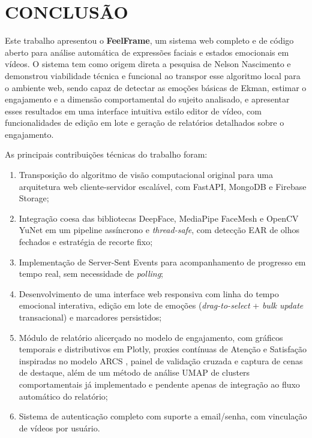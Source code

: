 \documentclass[
	12pt,
	openright,
	oneside,
	a4paper,
	english,
	brazil
	]{abntex2}
\begin{document}
\chapter{CONCLUSÃO}
\label{cap:conclusao}

Este trabalho apresentou o \textbf{FeelFrame}, um sistema web completo e de código aberto para análise automática de expressões faciais e estados emocionais em vídeos. O sistema tem como origem direta a pesquisa de Nelson Nascimento \cite{nascimento2024nelson} e demonstrou viabilidade técnica e funcional ao transpor esse algoritmo local para o ambiente web, sendo capaz de detectar as emoções básicas de Ekman, estimar o engajamento e a dimensão comportamental do sujeito analisado, e apresentar esses resultados em uma interface intuitiva estilo editor de vídeo, com funcionalidades de edição em lote e geração de relatórios detalhados sobre o engajamento.

As principais contribuições técnicas do trabalho foram:
\begin{enumerate}
    \item Transposição do algoritmo de visão computacional original \cite{nascimento2024nelson} para uma arquitetura web cliente-servidor escalável, com FastAPI, MongoDB e Firebase Storage;
    \item Integração coesa das bibliotecas DeepFace, MediaPipe FaceMesh e OpenCV YuNet em um pipeline assíncrono e \textit{thread-safe}, com detecção EAR de olhos fechados e estratégia de recorte fixo;
    \item Implementação de Server-Sent Events para acompanhamento de progresso em tempo real, sem necessidade de \textit{polling};
    \item Desenvolvimento de uma interface web responsiva com linha do tempo emocional interativa, edição em lote de emoções (\textit{drag-to-select} + \textit{bulk update} transacional) e marcadores persistidos;
    \item Módulo de relatório alicerçado no modelo de engajamento, com gráficos temporais e distributivos em Plotly, proxies contínuas de Atenção e Satisfação inspiradas no modelo ARCS \cite{keller1987arcs}, painel de validação cruzada e captura de cenas de destaque, além de um método de análise UMAP \cite{mcinnes2018umap} de clusters comportamentais já implementado e pendente apenas de integração ao fluxo automático do relatório;
    \item Sistema de autenticação completo com suporte a email/senha, com vinculação de vídeos por usuário.
\end{enumerate}
\end{document}
